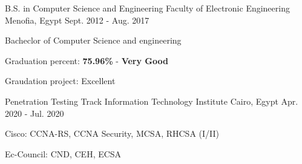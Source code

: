 

\begin{cventries}

  \cventry
    {B.S. in Computer Science and Engineering} %
    {Faculty of Electronic Engineering} %
    {Menofia, Egypt} %
    {Sept. 2012 - Aug. 2017} %
    {
      \begin{cvitems} %
        \item {Bacheclor of Computer Science and engineering}
        \item {Graduation percent: \textbf{75.96\%} - \textbf{Very Good} }
        \item {Graudation project: Excellent}
      \end{cvitems}
    }

  \cventry
    {Penetration Testing Track} %
    {Information Technology Institute} %
    {Cairo, Egypt} %
    {Apr. 2020 - Jul. 2020} %
    {
      \begin{cvitems} %
        \item {Cisco: CCNA-RS, CCNA Security, MCSA, RHCSA (I/II)}
        \item {Ec-Council: CND, CEH, ECSA}
      \end{cvitems}
    }
\end{cventries}
